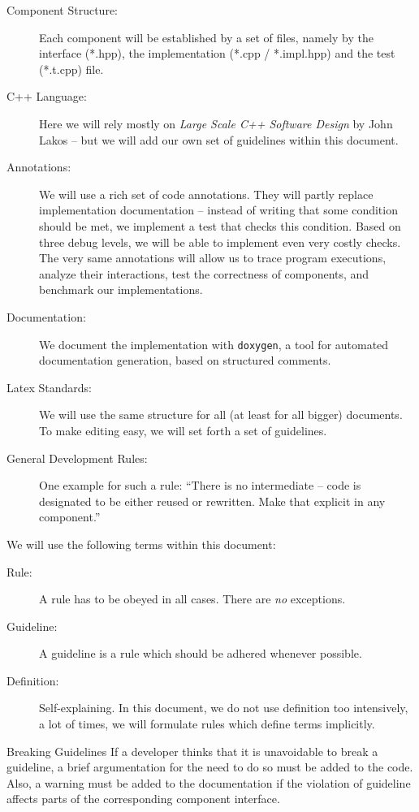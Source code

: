 \begin{description}
\item[Component Structure:] Each component will be established by a
  set of files, namely by the interface (*.hpp), the implementation
  (*.cpp / *.impl.hpp) and the test (*.t.cpp) file. 
\item[C++ Language:] Here we will rely mostly on
  \emph{Large Scale C++ Software Design} by John Lakos --
  but we will add our own set of guidelines within this document. 
\item[Annotations:] We will use a rich set of code annotations. They
  will partly replace implementation documentation -- instead of
  writing that some condition should be met, we implement a test that
  checks this condition. Based on three debug levels, we will be able
  to implement even very costly checks.\\
  The very same annotations will allow us to trace program executions,
  analyze their interactions, test the correctness of components, and
  benchmark our implementations.
\item[Documentation:] We document the implementation with {\tt doxygen}, a
  tool for automated documentation generation, based on structured
  comments.
\item[Latex Standards:] We will use the same structure for all (at
  least for all bigger) documents. To make editing easy, we will set
  forth a set of guidelines.
\item[General Development Rules:] One example for such a rule: ``There
  is no intermediate -- code is designated to be either reused or
  rewritten. Make that explicit in any component.''
\end{description}


We will use the following terms within this document:
%
\begin{description}
\item[Rule:] A rule has to be obeyed in all cases. There are \emph{no}
  exceptions.
\item[Guideline:] A guideline is a rule which should be adhered whenever
  possible. 
\item[Definition:] Self-explaining. In this document, we do not use
  definition too intensively, a lot of times, we will formulate rules
  which define terms implicitly. 
\end{description}

\begin{rule*}{Breaking Guidelines}
  If a developer thinks that it is unavoidable to break a guideline, a
  brief argumentation for the need to do so must be added to the code.
  Also, a warning must be added to the documentation if the violation
  of guideline affects parts of the corresponding component interface.
\end{rule*}

